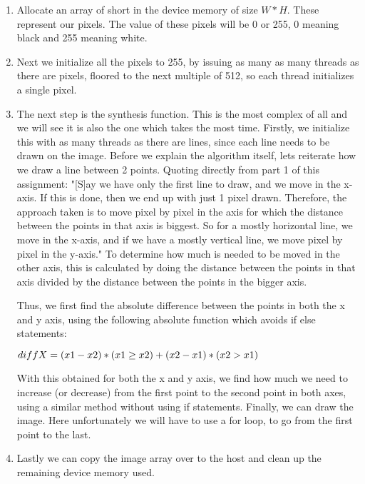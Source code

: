 \begin{enumerate}
	\item Allocate an array of short in the device memory of size $W*H$. These represent our pixels. The value of these pixels will be 0 or 255, 0 meaning black and 255 meaning white.
	
	\item Next we initialize all the pixels to 255, by issuing as many as many threads as there are pixels, floored to the next multiple of 512, so each thread initializes a single pixel.
	
	\item The next step is the synthesis function. This is the most complex of all and we will see it is also the one which takes the most time. Firstly, we initialize this with as many threads as there are lines, since each line needs to be drawn on the image. Before we explain the algorithm itself, lets reiterate how we draw a line between 2 points. Quoting directly from part 1 of this assignment: "[S]ay we have only the first line to draw, and we move in the x-axis. If this is done, then we end up with just 1 pixel drawn. Therefore, the approach taken is to move pixel by pixel in the axis for which the distance between the points in that axis is biggest. So for a mostly horizontal line, we move in the x-axis, and if we have a mostly vertical line, we move pixel by pixel in the y-axis." To determine how much is needed to be moved in the other axis, this is calculated by doing the distance between the points in that axis divided by the distance between the points in the bigger axis.
	
	Thus, we first find the absolute difference between the points in both the x and y axis, using the following absolute function which avoids if else statements:
	
	$diffX = (x1-x2)*(x1\ge x2) +\\ (x2-x1)*(x2>x1)$
	
	With this obtained for both the x and y axis, we find how much we need to increase (or decrease) from the first point to the second point in both axes, using a similar method without using if statements. Finally, we can draw the image. Here unfortunately we will have to use a for loop, to go from the first point to the last.
	
	\item Lastly we can copy the image array over to the host and clean up the remaining device memory used.
\end{enumerate}